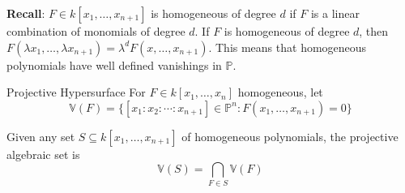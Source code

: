 \documentclass{report}
\begin{document}
\textbf{Recall}: $F \in k[x_{1}, \ldots, x_{n + 1}]$ is homogeneous of degree $d$ if $F$ is a linear combination of monomials of degree $d$. If $F$ is homogeneous of degree $d$, then $F(\lambda x_{1}, \ldots, \lambda x_{n + 1}) = \lambda^{d}F(x, \ldots, x_{n + 1})$. This means that homogeneous polynomials have well defined vanishings in $\mathbb{P}$. 

\begin{definition}{Projective Hypersurface}
    For $F \in k[x_{1}, \ldots, x_{n}]$ homogeneous, let 
        \begin{equation*}
            \mathbb{V}(F) = \{[x_{1} : x_{2} : \cdots : x_{n + 1}] \in \mathbb{P}^{n} : F(x_{1}, \ldots, x_{n + 1}) = 0\}
        \end{equation*}
\end{definition}

Given any set $S \subseteq k[x_{1}, \ldots, x_{n + 1}]$ of homogeneous polynomials, the projective algebraic set is
    \begin{equation*}
        \mathbb{V}(S) =  \bigcap_{F \in S}\mathbb{V}(F)
    \end{equation*}
\end{document}
